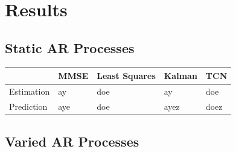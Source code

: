 \documentclass[twocolumn,letterpaper]{IEEEAerospaceCLS}  %
\begin{document}
\section{Results}
\label{sec:results}

\subsection{Static AR Processes}

\begin{table}[!h]
\begin{tabular}{|l|l|l|l|l|}
\hline
                            & MMSE                 & Least Squares        & Kalman         & TCN                   \\ \hline
\multirow{3}{*}{Estimation} & \multirow{3}{*}{ay}  & \multirow{3}{*}{doe} & \multirow{3}{*}{ay}   & \multirow{3}{*}{doe}  \\
                            &                      &                      &                       &                       \\
                            &                      &                      &                       &                       \\ \hline
\multirow{3}{*}{Prediction} & \multirow{3}{*}{aye} & \multirow{3}{*}{doe} & \multirow{3}{*}{ayez} & \multirow{3}{*}{doez} \\
                            &                      &                      &                       &                       \\
                            &                      &                      &                       &                       \\ \hline
\end{tabular}
\end{table}

\newpage

\subsection{Varied AR Processes}
\end{document}
